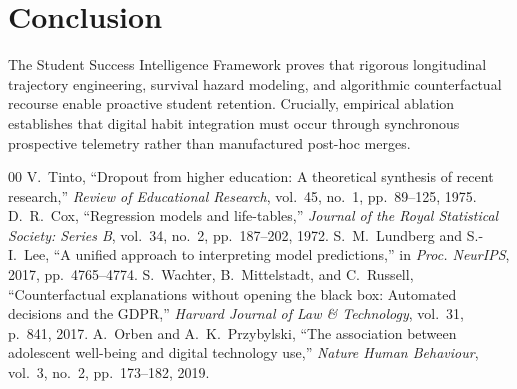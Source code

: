 \documentclass[10pt,journal,compsoc]{IEEEtran}
\begin{document}
\section{Conclusion}
The Student Success Intelligence Framework proves that rigorous longitudinal trajectory engineering, survival hazard modeling, and algorithmic counterfactual recourse enable proactive student retention. Crucially, empirical ablation establishes that digital habit integration must occur through synchronous prospective telemetry rather than manufactured post-hoc merges.


\begin{thebibliography}{00}
 V.~Tinto, ``Dropout from higher education: A theoretical synthesis of recent research,'' \emph{Review of Educational Research}, vol.~45, no.~1, pp.~89--125, 1975.
 D.~R.~Cox, ``Regression models and life-tables,'' \emph{Journal of the Royal Statistical Society: Series B}, vol.~34, no.~2, pp.~187--202, 1972.
 S.~M.~Lundberg and S.-I.~Lee, ``A unified approach to interpreting model predictions,'' in \emph{Proc. NeurIPS}, 2017, pp.~4765--4774.
 S.~Wachter, B.~Mittelstadt, and C.~Russell, ``Counterfactual explanations without opening the black box: Automated decisions and the GDPR,'' \emph{Harvard Journal of Law \& Technology}, vol.~31, p.~841, 2017.
 A.~Orben and A.~K.~Przybylski, ``The association between adolescent well-being and digital technology use,'' \emph{Nature Human Behaviour}, vol.~3, no.~2, pp.~173--182, 2019.
\end{thebibliography}
\end{document}
